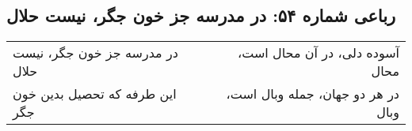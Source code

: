 \begin{center}
\section*{رباعی شماره ۵۴: در مدرسه جز خون جگر، نیست حلال}
\label{sec:054}
\begin{longtable}{l p{0.5cm} r}
در مدرسه جز خون جگر، نیست حلال
&&
آسوده دلی، در آن محال است، محال
\\
این طرفه که تحصیل بدین خون جگر
&&
در هر دو جهان، جمله وبال است، وبال
\\
\end{longtable}
\end{center}
